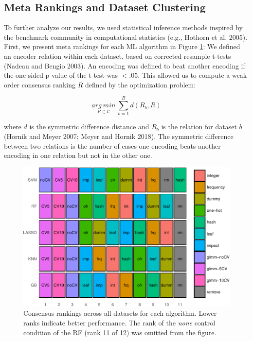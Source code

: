 \documentclass[smallextended]{svjour3}       %
\begin{document}
\hypertarget{meta-rankings-and-dataset-clustering}{%
\subsection{Meta Rankings and Dataset Clustering}\label{meta-rankings-and-dataset-clustering}}

To further analyze our results, we used statistical inference methods inspired by the benchmark community in computational statistics (e.g., Hothorn et al. 2005).
First, we present meta rankings for each ML algorithm in Figure \ref{fig:rank-res}:
We defined an encoder relation within each dataset, based on corrected resample t-tests (Nadeau and Bengio 2003).
An encoding was defined to beat another encoding if the one-sided p-value of the t-test was \(< .05\).
This allowed us to compute a weak-order consensus ranking \(R\) defined by the optimization problem:

\[ \underset{R \in \mathcal{C}}{arg\ min} \ \sum_{b=1}^B d(R_b, R)\]

where \(d\) is the symmetric difference distance and \(R_b\) is the relation for dataset \(b\) (Hornik and Meyer 2007; Meyer and Hornik 2018).
The symmetric difference between two relations is the number of cases one encoding beats another encoding in one relation but not in the other one.



\begin{figure}
\includegraphics[width=\textwidth,height=.55\textwidth]{rank-res-1} \caption{Consensus rankings across all datasets for each algorithm. Lower ranks indicate better performance. The rank of the \emph{none} control condition of the RF (rank 11 of 12) was omitted from the figure.}\label{fig:rank-res}
\end{figure}
\end{document}
